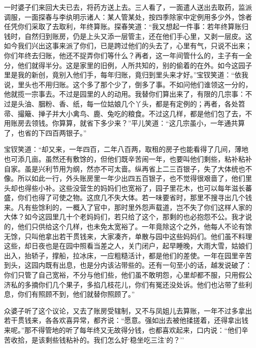 一时婆子们来回大夫已去，将药方送上去。三人看了，一面遣人送出去取药，监派调服，一面探春与李纨明示诸人：某人管某处，按四季除家中定例用多少外，馀者任凭你们采取了去取利，年终算账。探春笑道：``我又想起一件事：若年终算账归钱时，自然归到账房，仍是上头又添一层管主，还在他们手心里，又剥一层皮。这如今我们兴出这事来派了你们，已是跨过他们的头去了，心里有气，只说不出来；你们年终去归账，他还不捉弄你们等什么？再者，这一年间管什么的，主子有一全分，他们就得半分。这是家里的旧例，人所共知的，别的偷着的在外。如今这园子里是我的新创，竟别入他们手，每年归账，竟归到里头来才好。''宝钗笑道：``依我说，里头也不用归账。这个多了那个少了，倒多了事。不如问他们谁领这一分的，他就揽一宗事去。不过是园里的人的动用。我替你们算出来了，有限的几宗事：不过是头油、胭粉、香、纸，每一位姑娘几个丫头，都是有定例的；再者，各处笤帚、撮簸、掸子并大小禽鸟、鹿、兔吃的粮食。不过这几样，都是他们包了去，不用账房去领钱。你算算，就省下多少来？''平儿笑道：``这几宗虽小，一年通共算了，也省的下四百两银子。''

宝钗笑道：``却又来，一年四百，二年八百两，取租的房子也能看得了几间，薄地也可添几亩。虽然还有敷馀的，但他们既辛苦闹一年，也要叫他们剩些，粘补粘补自家。虽是兴利节用为纲，然亦不可太啬。纵再省上二三百银子，失了大体统也不像。所以如此一行，外头账房里一年少出四五百银子，也不觉得很艰啬了，他们里头却也得些小补。这些没营生的妈妈们也宽裕了，园子里花木，也可以每年滋长蕃盛，你们也得了可使之物。这庶几不失大体。若一味要省时，那里不搜寻出几个钱来。凡有些馀利的，一概入了官中，那时里外怨声载道，岂不失了你们这样人家的大体？如今这园里几十个老妈妈们，若只给了这个，那剩的也必抱怨不公。我才说的，他们只供给这个几样，也未免太宽裕了。一年竟除这个之外，他每人不论有馀无馀，只叫他拿出若干贯钱来，大家凑齐，单散与园中这些妈妈们。他们虽不料理这些，却日夜也是在园中照看当差之人，关门闭户，起早睡晚，大雨大雪，姑娘们出入，抬轿子，撑船，拉冰床，一应粗糙活计，都是他们的差使。一年在园里辛苦到头，这园内既有出息，也是分内该沾带些的。还有一句至小的话，越发说破了：你们只管了自己宽裕，不分与他们些，他们虽不敢明怨，心里却都不服，只用假公济私的多摘你们几个果子，多掐几枝花儿，你们有冤还没处诉。他们也沾带了些利息，你们有照顾不到，他们就替你照顾了。''

众婆子听了这个议论，又去了账房受辖制，又不与凤姐儿去算账，一年不过多拿出若干贯钱来，各各欢喜异常，都齐说：``愿意。强如出去被他揉搓着，还得拿出钱来呢。''那不得管地的听了每年终又无故得分钱，也都喜欢起来，口内说：``他们辛苦收拾，是该剩些钱粘补的。我们怎么好`稳坐吃三注'的？''

